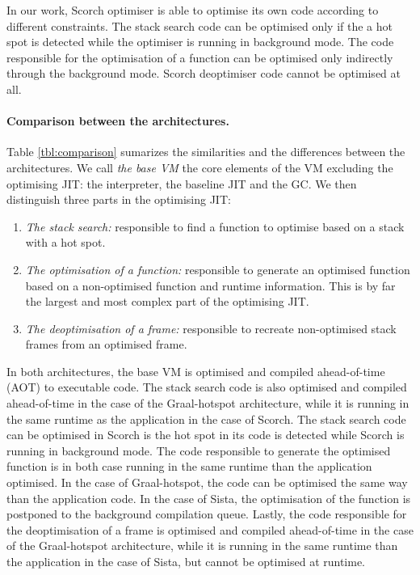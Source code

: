 \documentclass[a4paper,12pt,twoside]{../includes/ThesisStyle}
\begin{document}
In our work, Scorch optimiser is able to optimise its own code according to different constraints. The stack search code can be optimised only if the a hot spot is detected while the optimiser is running in background mode. The code responsible for the optimisation of a function can be optimised only indirectly through the background mode. Scorch deoptimiser code cannot be optimised at all. 

\paragraph{Comparison between the architectures.}Table \ref{tbl:comparison} sumarizes the similarities and the differences between the architectures. We call \emph{the base VM} the core elements of the VM excluding the optimising JIT: the interpreter, the baseline JIT and the GC. We then distinguish three parts in the optimising JIT:
\begin{enumerate}
	\item \emph{The stack search:} responsible to find a function to optimise based on a stack with a hot spot.
	\item \emph{The optimisation of a function:} responsible to generate an optimised function based on a non-optimised function and runtime information. This is by far the largest and most complex part of the optimising JIT.
	\item \emph{The deoptimisation of a frame:} responsible to recreate non-optimised stack frames from an optimised frame. 
\end{enumerate}
In both architectures, the base VM is optimised and compiled ahead-of-time (AOT) to executable code. The stack search code is also optimised and compiled ahead-of-time in the case of the Graal-hotspot architecture, while it is running in the same runtime as the application in the case of Scorch. The stack search code can be optimised in Scorch is the hot spot in its code is detected while Scorch is running in background mode. The code responsible to generate the optimised function is in both case running in the same runtime than the application optimised. In the case of Graal-hotspot, the code can be optimised the same way than the application code. In the case of Sista, the optimisation of the function is postponed to the background compilation queue. Lastly, the code responsible for the deoptimisation of a frame is optimised and compiled ahead-of-time in the case of the Graal-hotspot architecture, while it is running in the same runtime than the application in the case of Sista, but cannot be optimised at runtime.
\end{document}
